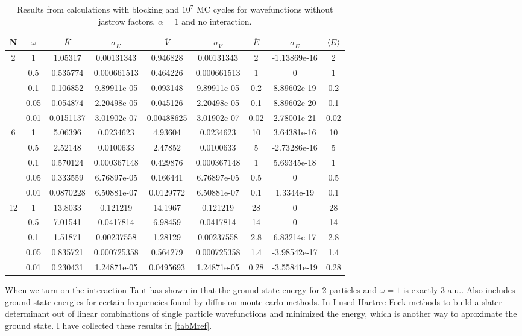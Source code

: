 \documentclass[a4paper,English,10pt]{article}
\renewcommand{\bar}{\overline}
\renewcommand{\braket}{\Braket}
\begin{document}
\begin{table}
  \centering
  \caption[Results without jastrow factor or interaction]{Results from  calculations with blocking and $10^7$ MC cycles for wavefunctions without jastrow factors, $\alpha = 1$ and no interaction.}
  \label{tabGround}
  \begin{tabular}{*{9}c}
    \toprule
    N & $\omega$ & $\bar{K}$ & $\sigma_{\bar{K}}$& $\bar{V}$& $\sigma_{\bar{V}}$& $\bar{E}$  & $\sigma_{\bar{E}}$ &$\braket{E}$\\
    \midrule
    2 &1&1.05317	&0.00131343	&0.946828	&0.00131343	&2	&-1.13869e-16 &2\\
    &0.5&0.535774	&0.000661513	&0.464226	&0.000661513	&1&	0 & 1\\
    &0.1&0.106852	&9.89911e-05	&0.093148	&9.89911e-05	&0.2	&8.89602e-19 & 0.2\\
    &0.05&0.054874	&2.20498e-05	&0.045126	&2.20498e-05	&0.1	&8.89602e-20 & 0.1\\
    &0.01&0.0151137	&3.01902e-07	&0.00488625	&3.01902e-07	&0.02	&2.78001e-21  &0.02\\
    \midrule
    6&1&5.06396	&0.0234623	&4.93604	&0.0234623	&10	&3.64381e-16 &10\\
    &0.5&2.52148	&0.0100633	&2.47852	&0.0100633	&5	&-2.73286e-16 &5\\
    &0.1&0.570124	&0.000367148	&0.429876	&0.000367148	&1	&5.69345e-18  &1\\
    &0.05&0.333559	&6.76897e-05	&0.166441	&6.76897e-05	&0.5	&0      &0.5\\
    &0.01&0.0870228	&6.50881e-07	&0.0129772	&6.50881e-07	&0.1	&1.3344e-19 & 0.1\\
    \midrule
    12&1&13.8033	&0.121219	&14.1967	&0.121219	&28	&0 &28\\
    &0.5&7.01541	&0.0417814	&6.98459	&0.0417814	&14	&0 &14\\
    &0.1&1.51871	&0.00237558	&1.28129	&0.00237558	&2.8	&6.83214e-17 &2.8\\
    &0.05&0.835721	&0.000725358	&0.564279	&0.000725358	&1.4	&-3.98542e-17 &1.4\\
    &0.01&0.230431	&1.24871e-05	&0.0495693	&1.24871e-05	&0.28	&-3.55841e-19  &0.28\\
    \bottomrule
  \end{tabular}
\end{table}

When we turn on the interaction Taut has shown in \cite{taut} that the ground state energy for 2 particles and $\omega = 1$ is exactly 3 a.u..
Also \cite{mortenref} includes ground state energies for certain frequencies found by diffusion monte carlo methods. In \cite{proj1} I used Hartree-Fock methods to build a slater
determinant out of linear combinations of single particle wavefunctions and minimized the energy, which is another way to aproximate the ground state.
I have collected these results in \ref{tabMref}.
\end{document}
